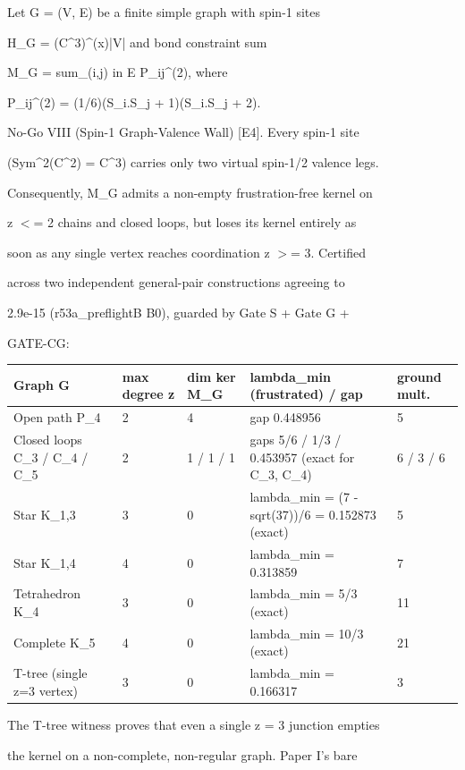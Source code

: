\documentclass[11pt,a4paper]{article}
\theoremstyle{definition}
\begin{document}
Let G = (V, E) be a finite simple graph with spin-1 sites

H\_G = (C\^{}3)\^{}{(x)|V|} and bond constraint sum

M\_G = sum\_{(i,j) in E} P\_{ij}\^{}{(2)}, where

P\_{ij}\^{}{(2)} = (1/6)(S\_i.S\_j + 1)(S\_i.S\_j + 2).


No-Go VIII (Spin-1 Graph-Valence Wall) [E4]. Every spin-1 site

(Sym\^{}2(C\^{}2) = C\^{}3) carries only two virtual spin-1/2 valence legs.

Consequently, M\_G admits a non-empty frustration-free kernel on

z $<$= 2 chains and closed loops, but loses its kernel entirely as

soon as any single vertex reaches coordination z $>$= 3. Certified

across two independent general-pair constructions agreeing to

2.9e-15 (r53a\_preflightB B0), guarded by Gate S + Gate G +

GATE-CG:


\begin{center}
\small
\begin{tabularx}{\linewidth}{l X X X X}
\toprule
\textbf{Graph G} & \textbf{max degree z} & \textbf{dim ker M\_G} & \textbf{lambda\_min (frustrated) / gap} & \textbf{ground mult.} \\ \midrule
Open path P\_4 & 2 & 4 & gap 0.448956 & 5 \\
Closed loops C\_3 / C\_4 / C\_5 & 2 & 1 / 1 / 1 & gaps 5/6 / 1/3 / 0.453957 (exact for C\_3, C\_4) & 6 / 3 / 6 \\
Star K\_{1,3} & 3 & 0 & lambda\_min = (7 - sqrt(37))/6 = 0.152873 (exact) & 5 \\
Star K\_{1,4} & 4 & 0 & lambda\_min = 0.313859 & 7 \\
Tetrahedron K\_4 & 3 & 0 & lambda\_min = 5/3 (exact) & 11 \\
Complete K\_5 & 4 & 0 & lambda\_min = 10/3 (exact) & 21 \\
T-tree (single z=3 vertex) & 3 & 0 & lambda\_min = 0.166317 & 3 \\
\bottomrule
\end{tabularx}
\end{center}

The T-tree witness proves that even a single z = 3 junction empties

the kernel on a non-complete, non-regular graph. Paper I's bare
\end{document}

